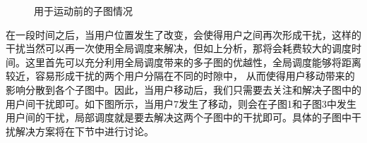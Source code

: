 \begin{figure}[htbp]
    \centering
    \caption{用于运动前的子图情况}
    \label{fig:slot-before-user-move}
\end{figure}

在一段时间之后，当用户位置发生了改变，会使得用户之间再次形成干扰，这样的干扰当然可以再一次使用全局调度来解决，但如上分析，那将会耗费较大的调度时间。这里首先可以充分利用全局调度带来的多子图的优越性，全局调度能够将距离较近，容易形成干扰的两个用户分隔在不同的时隙中，
从而使得用户移动带来的影响分散到各个子图中。因此，当用户移动后，我们只需要去关注和解决子图中的用户间干扰即可。如下图所示，当用户7发生了移动，则会在子图1和子图3中发生用户间的干扰，局部调度就是要去解决这两个子图中的干扰即可。具体的子图中干扰解决方案将在下节中进行讨论。

